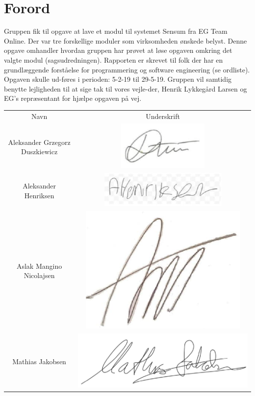 \chapter{Forord}
Gruppen fik til opgave at lave et modul til systemet Sensum fra EG Team Online. 
Der var tre forskellige moduler som virksomheden ønskede belyst. 
Denne opgave omhandler hvordan gruppen har prøvet at løse opgaven omkring det valgte modul (sagsudredningen). 
Rapporten er skrevet til folk der har en grundlæggende forståelse for programmering og software engineering (se ordliste). 
Opgaven skulle ud-føres i perioden: 5-2-19 til 29-5-19. 
Gruppen vil samtidig benytte lejligheden til at sige tak til vores vejle-der, Henrik Lykkegård Larsen og EG’s repræsentant for hjælpe opgaven på vej. 
\\ 
\begin{center}
\begin{longtable}{cc}
Navn & Underskrift \\
Aleksander Grzegorz Duszkiewicz & \includegraphics[width = 5 cm]{./PNG/underskrifter/Aleksander_D.PNG}\\ 
Aleksander Henriksen & \includegraphics[width = 5 cm]{./PNG/underskrifter/Aleksander_H.PNG}\\
Aslak Mangino Nicolajsen & \includegraphics[width = 5 cm]{./PNG/underskrifter/Aslak.PNG} \\
Mathias Jakobsen & \includegraphics[width = 5 cm]{./PNG/underskrifter/Mathias.PNG} \\ 

\end{longtable}
\end{center}
